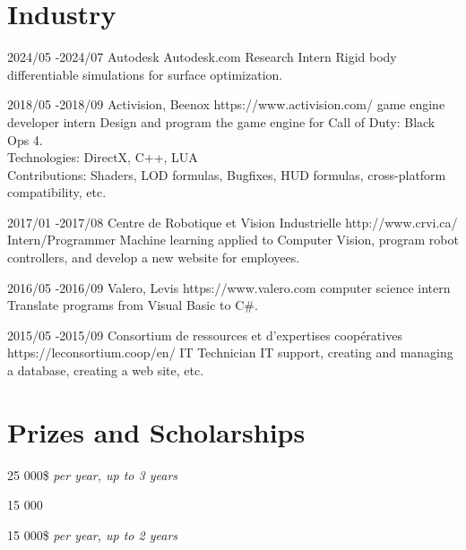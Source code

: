 \documentclass[10pt]{article} %
\begin{document}
\section{Industry}

\job
{2024/05 -}{2024/07}
{Autodesk}
{Autodesk.com}
{Research Intern}
{Rigid body differentiable simulations for surface optimization.}

\job
{2018/05 -}{2018/09}
{Activision, Beenox}
{https://www.activision.com/}
{game engine developer intern}
{Design and program the game engine for Call of Duty: Black Ops 4.\\
 Technologies: DirectX, C++, LUA \\
 Contributions: Shaders, LOD formulas, Bugfixes, HUD formulas, cross-platform compatibility, etc.}


\job
{2017/01 -}{2017/08}
{Centre de Robotique et Vision Industrielle}
{http://www.crvi.ca/}
{Intern/Programmer}
{Machine learning applied to Computer Vision, program robot controllers, and develop a new website for employees.}

\job
{2016/05 -}{2016/09}
{Valero, Levis}
{https://www.valero.com}
{computer science intern}
{Translate programs from Visual Basic to C\#.}

\job
{2015/05 -}{2015/09}
{Consortium de ressources et d'expertises coopératives}
{https://leconsortium.coop/en/}
{IT Technician}
{IT support, creating and managing a database, creating a web site, etc.}


\section{Prizes and Scholarships}

{
 25 000\$ \textit{per year, up to 3 years} \\
}

{
 15 000 \\
}

{
 15 000\$ \textit{per year, up to 2 years} \\
}
\end{document}
